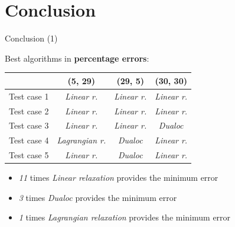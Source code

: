 \documentclass{beamer}
\begin{document}
	\section{Conclusion}
	\begin{frame}{Conclusion (1)}
	
	Best algorithms in \textbf{percentage errors}:
	\begin{table}
	\begin{tabular}{| l | ccc |}
	\hline
     & (5, 29) & (29, 5) & (30, 30) \\
    \hline
        \rowcolor{shadecolor}
        Test case 1 & \textit{Linear r.} & \textit{Linear r.} & \textit{Linear r.} \\
        Test case 2 & \textit{Linear r.} & \textit{Linear r.} & \textit{Linear r.} \\
        \rowcolor{shadecolor}
        Test case 3 & \textit{Linear r.} & \textit{Linear r.} & \textit{Dualoc} \\
        Test case 4 & \textit{Lagrangian r.} & \textit{Dualoc} & \textit{Linear r.} \\
        \rowcolor{shadecolor}
        Test case 5 & \textit{Linear r.} & \textit{Dualoc} & \textit{Linear r.} \\
    \hline
        
    \end{tabular}
    \end{table}
    
    \begin{itemize}
        \item \textit{11} times \textit{Linear relaxation} provides the minimum error
        \item \textit{3} times \textit{Dualoc} provides the minimum error
        \item \textit{1} times \textit{Lagrangian relaxation} provides the minimum error
    \end{itemize}
    
	\end{frame}
	
\end{document}
